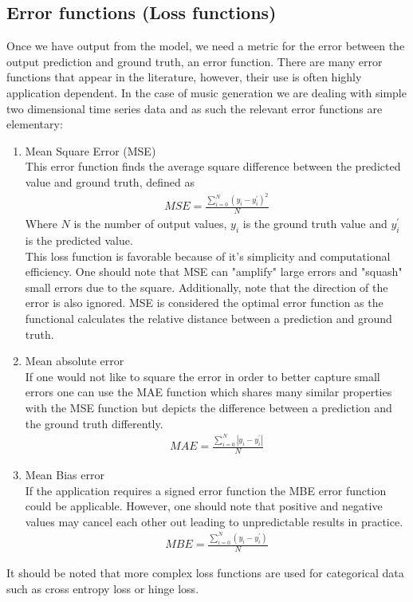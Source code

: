 \documentclass{article}
\begin{document}
\subsection{Error functions (Loss functions)}
\label{sec:error}
Once we have output from the model, we need a metric for the error between the output prediction and ground truth, an error function. There are many error functions that appear in the literature, however, their use is often highly application dependent. In the case of music generation we are dealing with simple two dimensional time series data and as such the relevant error functions are elementary:
\begin{enumerate}
\item Mean Square Error (MSE)\\
This error function finds the average square difference between the predicted value and ground truth, defined as
\begin{align*}
MSE = \frac{\sum_{i=0}^N (y_i - y_i^\prime)^2}{N}
\end{align*}
Where $N$ is the number of output values, $y_i$ is the ground truth value and $y_i^\prime$ is the predicted value. \\
This loss function is favorable because of it's simplicity and computational efficiency. One should note that MSE can "amplify" large errors and "squash" small errors due to the square. Additionally, note that the direction of the error is also ignored.  MSE is considered the optimal error function as the functional calculates the relative distance between a prediction and ground truth. 
\item Mean absolute error \\
If one would not like to square the error in order to better capture small errors one can use the MAE function which shares many similar properties with the MSE function but depicts the difference between a prediction and the ground truth differently. 
\begin{align*}
MAE = \frac{\sum_{i=0}^N |y_i - y_i^\prime|}{N}
\end{align*}
\item Mean Bias error \\
If the application requires a signed error function the MBE error function could be applicable. However, one should note that positive and negative values may cancel each other out leading to unpredictable results in practice. 
\begin{align*}
MBE = \frac{\sum_{i=0}^N (y_i - y_i^\prime)}{N}
\end{align*}
\end{enumerate}
It should be noted that more complex loss functions are used for categorical data such as cross entropy loss or hinge loss.
\end{document}
